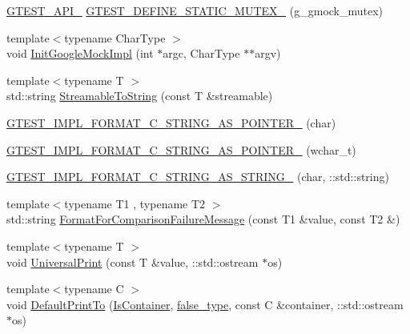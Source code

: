 \begin{DoxyCompactItemize}
\item 
\hyperlink{gtest-port_8h_aa73be6f0ba4a7456180a94904ce17790}{G\+T\+E\+S\+T\+\_\+\+A\+P\+I\+\_\+} \hyperlink{namespacetesting_1_1internal_a8c4aa7be8daa7b60e293071d70a89584}{G\+T\+E\+S\+T\+\_\+\+D\+E\+F\+I\+N\+E\+\_\+\+S\+T\+A\+T\+I\+C\+\_\+\+M\+U\+T\+E\+X\+\_\+} (g\+\_\+gmock\+\_\+mutex)
\item 
{\footnotesize template$<$typename Char\+Type $>$ }\\void \hyperlink{namespacetesting_1_1internal_a3823844199df88af9493026031cf7744}{Init\+Google\+Mock\+Impl} (int $\ast$argc, Char\+Type $\ast$$\ast$argv)
\item 
{\footnotesize template$<$typename T $>$ }\\std\+::string \hyperlink{namespacetesting_1_1internal_aad4beed95d0846e6ffc5da0978ef3bb9}{Streamable\+To\+String} (const T \&streamable)
\item 
\hyperlink{namespacetesting_1_1internal_a3682f962ae0ec1c0eca6444ca0a09e91}{G\+T\+E\+S\+T\+\_\+\+I\+M\+P\+L\+\_\+\+F\+O\+R\+M\+A\+T\+\_\+\+C\+\_\+\+S\+T\+R\+I\+N\+G\+\_\+\+A\+S\+\_\+\+P\+O\+I\+N\+T\+E\+R\+\_\+} (char)
\item 
\hyperlink{namespacetesting_1_1internal_a85e08f00d443221e529a0a85a90fbaeb}{G\+T\+E\+S\+T\+\_\+\+I\+M\+P\+L\+\_\+\+F\+O\+R\+M\+A\+T\+\_\+\+C\+\_\+\+S\+T\+R\+I\+N\+G\+\_\+\+A\+S\+\_\+\+P\+O\+I\+N\+T\+E\+R\+\_\+} (wchar\+\_\+t)
\item 
\hyperlink{namespacetesting_1_1internal_aeac30230dcc362221bdd07d61eaa4ec1}{G\+T\+E\+S\+T\+\_\+\+I\+M\+P\+L\+\_\+\+F\+O\+R\+M\+A\+T\+\_\+\+C\+\_\+\+S\+T\+R\+I\+N\+G\+\_\+\+A\+S\+\_\+\+S\+T\+R\+I\+N\+G\+\_\+} (char, \+::std\+::string)
\item 
{\footnotesize template$<$typename T1 , typename T2 $>$ }\\std\+::string \hyperlink{namespacetesting_1_1internal_a91ab078f10adc669f09b7f604975c518}{Format\+For\+Comparison\+Failure\+Message} (const T1 \&value, const T2 \&)
\item 
{\footnotesize template$<$typename T $>$ }\\void \hyperlink{namespacetesting_1_1internal_a30708fa2bacf11895b03bdb21eb72309}{Universal\+Print} (const T \&value, \+::std\+::ostream $\ast$os)
\item 
{\footnotesize template$<$typename C $>$ }\\void \hyperlink{namespacetesting_1_1internal_ac7dfe02c4c1cbfe89c23a93d873079c5}{Default\+Print\+To} (\hyperlink{namespacetesting_1_1internal_ad8f0c2883245f1df2a53618a49f0deb3}{Is\+Container}, \hyperlink{namespacetesting_1_1internal_abb1d0789f19bdde21affccbd1078b525}{false\+\_\+type}, const C \&container, \+::std\+::ostream $\ast$os)
$$
\end{DoxyCompactItemize}
